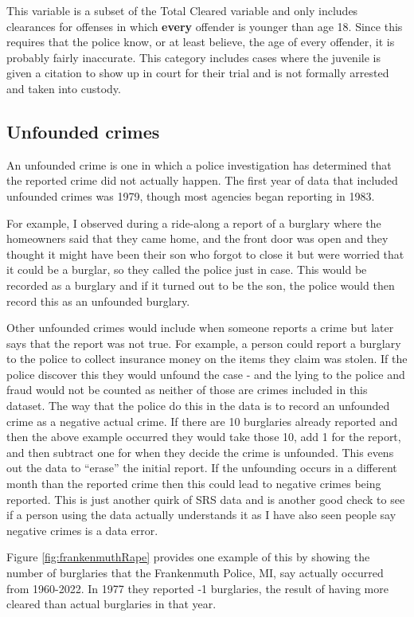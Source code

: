 \documentclass[
]{krantz}
\begin{document}
This variable is a subset of the Total Cleared variable and
only includes clearances for offenses in which
\textbf{every} offender is younger than age 18. Since this
requires that the police know, or at least believe, the age
of every offender, it is probably fairly inaccurate. This
category includes cases where the juvenile is given a
citation to show up in court for their trial and is not
formally arrested and taken into custody.

\subsection{Unfounded crimes}\label{unfounded}

An unfounded crime is one in which a police investigation
has determined that the reported crime did not actually
happen. The first year of data that included unfounded
crimes was 1979, though most agencies began reporting in
1983.

For example, I observed during a ride-along a report of a
burglary where the homeowners said that they came home, and
the front door was open and they thought it might have been
their son who forgot to close it but were worried that it
could be a burglar, so they called the police just in case.
This would be recorded as a burglary and if it turned out to
be the son, the police would then record this as an
unfounded burglary.

Other unfounded crimes would include when someone reports a
crime but later says that the report was not true. For
example, a person could report a burglary to the police to
collect insurance money on the items they claim was stolen.
If the police discover this they would unfound the case -
and the lying to the police and fraud would not be counted
as neither of those are crimes included in this dataset. The
way that the police do this in the data is to record an
unfounded crime as a negative actual crime. If there are 10
burglaries already reported and then the above example
occurred they would take those 10, add 1 for the report, and
then subtract one for when they decide the crime is
unfounded. This evens out the data to ``erase'' the initial
report. If the unfounding occurs in a different month than
the reported crime then this could lead to negative crimes
being reported. This is just another quirk of SRS data and
is another good check to see if a person using the data
actually understands it as I have also seen people say
negative crimes is a data error.

Figure \ref{fig:frankenmuthRape} provides one example of
this by showing the number of burglaries that the
Frankenmuth Police, MI, say actually occurred from
1960-2022. In 1977 they reported -1 burglaries, the result
of having more cleared than actual burglaries in that year.
\end{document}
